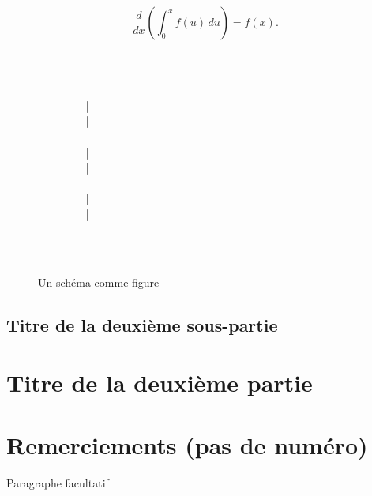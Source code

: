 \documentclass[10pt,a4paper,twoside]{article}
\begin{document}
	\[
        \frac{d}{dx}\left( \int_{0}^{x} f(u)\,du\right)=f(x).
     \]


\lipsum[6-7]

\begin{figure}[htbp] 
\begin{center} 
~\\
~\\
\\
 ~~~~~~~~ | \\
 ~~~~~~~~ | \\
\\
~~~~~~~~ | \\
~~~~~~~~ | \\
\\
~~~~~~~~ | \\
~~~~~~~~ | \\
\\

\end{center} 
\caption{Un schéma comme figure} \label{schema} \
\end{figure}

\lipsum[8]

\subsection{Titre de la deuxième sous-partie}

\lipsum[9]

\section{Titre de la deuxième partie}

\lipsum[10-11]

\section*{Remerciements (pas de numéro)} 

Paragraphe facultatif




\nocite{TALN2007,LaigneletRioult09,LanglaisPatry07,SeretanWehrli07}

\end{document}
